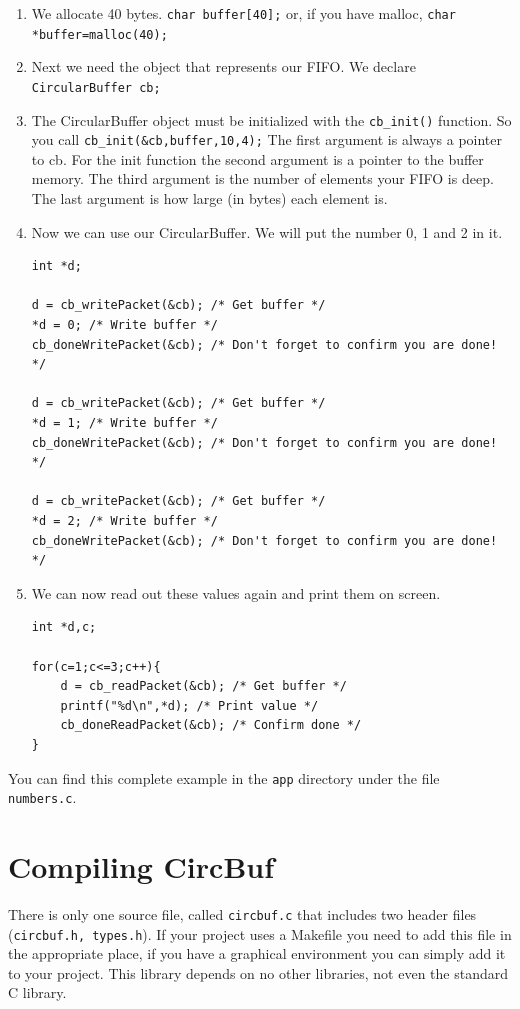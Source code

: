 \documentclass[a4paper]{article}
\begin{document}
\begin{enumerate}
	\item We allocate 40 bytes. \lstinline!char buffer[40];! or, if you have malloc, \lstinline!char *buffer=malloc(40);!
	\item Next we need the object that represents our FIFO. We declare \lstinline!CircularBuffer cb;!
	\item The CircularBuffer object must be initialized with the \texttt{cb\_init()} function.
	      So you call \lstinline!cb_init(&cb,buffer,10,4);! The first argument is always a pointer to cb. For the init function
	      the second argument is a pointer to the buffer memory. The third argument is the number of elements your FIFO is deep.
	      The last argument is how large (in bytes) each element is.
	\item Now we can use our CircularBuffer. We will put the number 0, 1 and 2 in it.
		\begin{lstlisting}
int *d;

d = cb_writePacket(&cb); /* Get buffer */
*d = 0; /* Write buffer */
cb_doneWritePacket(&cb); /* Don't forget to confirm you are done! */

d = cb_writePacket(&cb); /* Get buffer */
*d = 1; /* Write buffer */
cb_doneWritePacket(&cb); /* Don't forget to confirm you are done! */

d = cb_writePacket(&cb); /* Get buffer */
*d = 2; /* Write buffer */
cb_doneWritePacket(&cb); /* Don't forget to confirm you are done! */
		\end{lstlisting}
	\item We can now read out these values again and print them on screen.
		\begin{lstlisting}
int *d,c;

for(c=1;c<=3;c++){
	d = cb_readPacket(&cb); /* Get buffer */
	printf("%d\n",*d); /* Print value */
	cb_doneReadPacket(&cb); /* Confirm done */
}
		\end{lstlisting}
\end{enumerate}

You can find this complete example in the \texttt{app} directory under the file \texttt{numbers.c}.

\section{Compiling CircBuf}
There is only one source file, called \texttt{circbuf.c} that includes two header files (\texttt{circbuf.h, types.h}).
If your project uses a Makefile you need to add this file in the appropriate place, if you have a graphical environment
you can simply add it to your project. This library depends on no other libraries, not even the standard C library.
\end{document}
